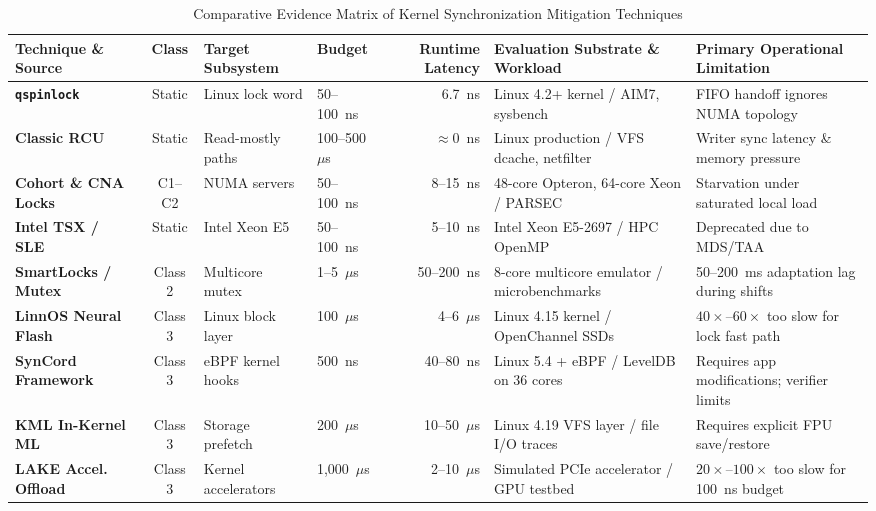 \documentclass[conference]{IEEEtran}
\begin{document}
\begin{table}[t]
\centering
\caption{Comparative Evidence Matrix of Kernel Synchronization Mitigation Techniques}
\label{tab:matrix}
\begin{tabular}{lcllrll}
\toprule
\textbf{Technique \& Source} & \textbf{Class} & \textbf{Target Subsystem} & \textbf{Budget} & \textbf{Runtime Latency} & \textbf{Evaluation Substrate \& Workload} & \textbf{Primary Operational Limitation} \\
\midrule
\textbf{\texttt{qspinlock}}~\cite{cho2022survey,long2014qspinlock} & Static & Linux lock word & 50--100~ns & 6.7~ns & Linux 4.2+ kernel / AIM7, sysbench & FIFO handoff ignores NUMA topology \\
\textbf{Classic RCU}~\cite{mckenney2021parallel,mckenney2020rcu} & Static & Read-mostly paths & 100--500~$\mu$s & $\approx 0$~ns & Linux production / VFS dcache, netfilter & Writer sync latency \& memory pressure \\
\textbf{Cohort \& CNA Locks}~\cite{dice2012lock,dice2019cna} & C1--C2 & NUMA servers & 50--100~ns & 8--15~ns & 48-core Opteron, 64-core Xeon / PARSEC & Starvation under saturated local load \\
\textbf{Intel TSX / SLE}~\cite{rajwar2001speculative,yoo2013performance} & Static & Intel Xeon E5 & 50--100~ns & 5--10~ns & Intel Xeon E5-2697 / HPC OpenMP & Deprecated due to MDS/TAA~\cite{intel2019mds} \\
\textbf{SmartLocks / Mutex}~\cite{eastep2010smartlocks,karlin1991empirical} & Class 2 & Multicore mutex & 1--5~$\mu$s & 50--200~ns & 8-core multicore emulator / microbenchmarks & 50--200~ms adaptation lag during shifts \\
\textbf{LinnOS Neural Flash}~\cite{hao2020linnos} & Class 3 & Linux block layer & 100~$\mu$s & 4--6~$\mu$s & Linux 4.15 kernel / OpenChannel SSDs & $40\times$--$60\times$ too slow for lock fast path \\
\textbf{SynCord Framework}~\cite{park2022application} & Class 3 & eBPF kernel hooks & 500~ns & 40--80~ns & Linux 5.4 + eBPF / LevelDB on 36 cores & Requires app modifications; verifier limits \\
\textbf{KML In-Kernel ML}~\cite{agadakos2020kml} & Class 3 & Storage prefetch & 200~$\mu$s & 10--50~$\mu$s & Linux 4.19 VFS layer / file I/O traces & Requires explicit FPU save/restore \\
\textbf{LAKE Accel. Offload}~\cite{fingler2023lake} & Class 3 & Kernel accelerators & 1,000~$\mu$s & 2--10~$\mu$s & Simulated PCIe accelerator / GPU testbed & $20\times$--$100\times$ too slow for 100~ns budget \\

\end{tabular}
\end{table}
\end{document}
